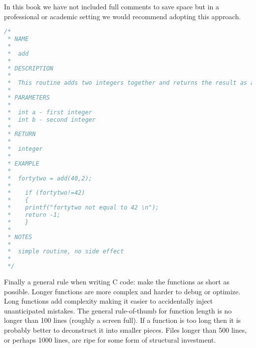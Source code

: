 In this book we have not included full comments to save space but in a professional or academic setting we would recommend adopting this approach.\\
  
\begin{lstlisting}[language=C,caption={Example function header comment},captionpos=b,label=stdcommblock]
/*
 * NAME
 *
 *  add
 *
 * DESCRIPTION
 *
 *  This routine adds two integers together and returns the result as an integer. 
 *
 * PARAMETERS
 *
 *  int a - first integer 
 *  int b - second integer
 *
 * RETURN
 *
 *  integer
 *
 * EXAMPLE
 *
 *  fortytwo = add(40,2);
 *
 *    if (fortytwo!=42)
 *    { 
 *    printf("fortytwo not equal to 42 \n");
 *    return -1;
 *    }
 *
 * NOTES
 *
 *  simple routine, no side effect
 *
 */
\end{lstlisting}


Finally a general rule when writing C code: make the functions as short as possible. Longer functions are more complex and harder to debug or optimize. Long functions add complexity making it easier to accidentally inject unanticipated mistakes. The general rule-of-thumb for function length is no longer than 100 lines (roughly a screen full). If a function is too long then it is probably better to deconstruct it into smaller pieces. Files longer than 500 lines, or perhaps 1000 lines, are ripe for some form of structural investment.\\



